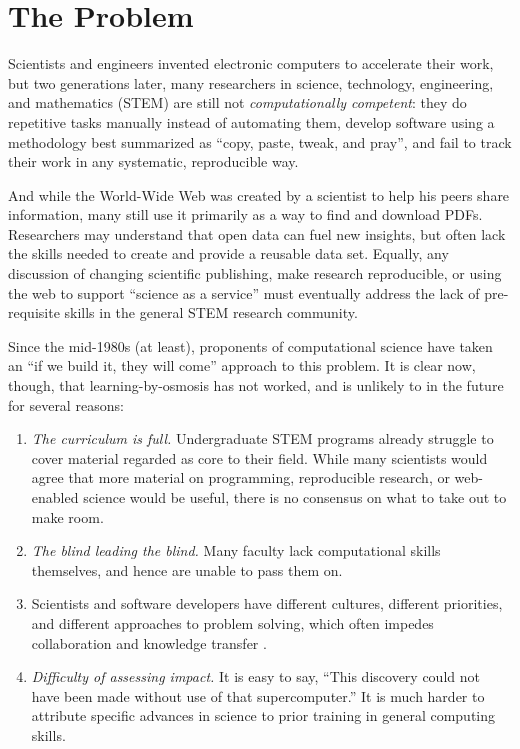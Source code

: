 \documentclass[11pt]{article}
\begin{document}
\pagebreak

\section{The Problem}

Scientists and engineers invented electronic computers to accelerate
their work, but two generations later, many researchers in science,
technology, engineering, and mathematics (STEM) are still not
\emph{computationally competent}: they do repetitive tasks manually
instead of automating them, develop software using a methodology best
summarized as ``copy, paste, tweak, and pray'', and fail to track
their work in any systematic, reproducible way.

And while the World-Wide Web was created by a scientist to help his
peers share information, many still use it primarily as a way to find
and download PDFs.  Researchers may understand that open data can fuel
new insights, but often lack the skills needed to create and provide a
reusable data set.  Equally, any discussion of changing scientific
publishing, make research reproducible, or using the web to support
``science as a service'' must eventually address the lack of
pre-requisite skills in the general STEM research community.

Since the mid-1980s (at least), proponents of computational science
have taken an ``if we build it, they will come'' approach to this
problem.  It is clear now, though, that learning-by-osmosis has not
worked, and is unlikely to in the future for several reasons:

\begin{enumerate}

\item
  \emph{The curriculum is full.}  Undergraduate STEM programs already
  struggle to cover material regarded as core to their field.  While
  many scientists would agree that more material on programming,
  reproducible research, or web-enabled science would be useful, there
  is no consensus on what to take out to make room.

\item
  \emph{The blind leading the blind.}  Many faculty lack computational
  skills themselves, and hence are unable to pass them on.

\item
  Scientists and software developers have different cultures,
  different priorities, and different approaches to problem solving,
  which often impedes collaboration and knowledge transfer
  \cite{segal2005a}.

\item
  \emph{Difficulty of assessing impact.} It is easy to say, ``This
  discovery could not have been made without use of that
  supercomputer.''  It is much harder to attribute specific advances
  in science to prior training in general computing skills.

\end{enumerate}
\end{document}
